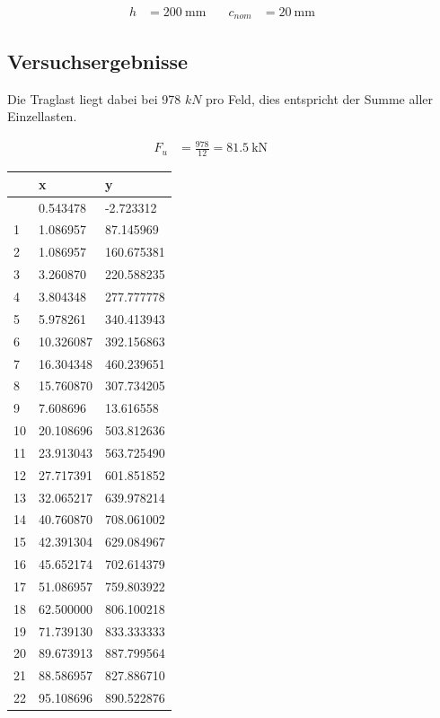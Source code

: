 \documentclass[
  11pt,
  letterpaper,
]{scrreprt}
\begin{document}
\[
\begin{aligned}
h& = 200 \ \mathrm{mm} \quad & c_{nom}& = 20 \ \mathrm{mm} \quad &  
 \end{aligned}
\]

\subsection{Versuchsergebnisse}\label{versuchsergebnisse}

Die Traglast liegt dabei bei 978 \(kN\) pro Feld, dies entspricht der
Summe aller Einzellasten.

\[
\begin{aligned}
F_{u}& = \frac{978}{12} = 81.5 \ \mathrm{kN} \quad &  \quad &  
 \end{aligned}
\]

\begin{longtable}[]{@{}lll@{}}
\toprule\noalign{}
& x & y \\
\midrule\noalign{}
\endhead
\bottomrule\noalign{}
\endlastfoot
0 & 0.543478 & -2.723312 \\
1 & 1.086957 & 87.145969 \\
2 & 1.086957 & 160.675381 \\
3 & 3.260870 & 220.588235 \\
4 & 3.804348 & 277.777778 \\
5 & 5.978261 & 340.413943 \\
6 & 10.326087 & 392.156863 \\
7 & 16.304348 & 460.239651 \\
8 & 15.760870 & 307.734205 \\
9 & 7.608696 & 13.616558 \\
10 & 20.108696 & 503.812636 \\
11 & 23.913043 & 563.725490 \\
12 & 27.717391 & 601.851852 \\
13 & 32.065217 & 639.978214 \\
14 & 40.760870 & 708.061002 \\
15 & 42.391304 & 629.084967 \\
16 & 45.652174 & 702.614379 \\
17 & 51.086957 & 759.803922 \\
18 & 62.500000 & 806.100218 \\
19 & 71.739130 & 833.333333 \\
20 & 89.673913 & 887.799564 \\
21 & 88.586957 & 827.886710 \\
22 & 95.108696 & 890.522876 \\

\end{longtable}
\end{document}
